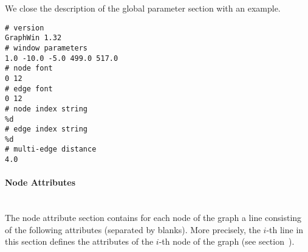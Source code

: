 We close the description of the global parameter section
with an example.

\begin{verbatim}
# version
GraphWin 1.32
# window parameters
1.0 -10.0 -5.0 499.0 517.0
# node font
0 12
# edge font
0 12
# node index string
%d
# edge index string
%d
# multi-edge distance
4.0
\end{verbatim}




\paragraph{Node Attributes}\ \\

The node attribute section contains for each node of the graph
a line consisting of the following attributes (separated by blanks).
More precisely, the $i$-th line in this section defines the attributes
of the $i$-th node of the graph (see section~).

